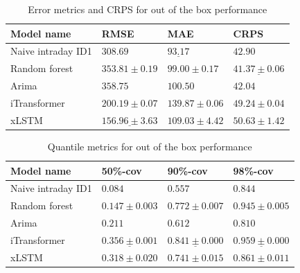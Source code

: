 \documentclass[class=scrbook, crop=false]{standalone}
\begin{document}
  
  \begin{table}[]
\centering
\begin{tabular}{l|l|l|l}
Model name 		&  RMSE 			& MAE 			& CRPS 			\\\hline
Naive intraday ID1 	&$ 308.69 			$&$ \underline{93.17} 			$&$ 42.90			$ \\
Random forest 		&$ 353.81 \pm 0.19	$&$  99.00	\pm 0.17	$&$ \underline{41.37 \pm 0.06}	$\\
Arima 			&$ 358.75 			$&$ 100.50 		$&$ 42.04  			$\\	
iTransformer 		&$ 200.19 \pm 0.07	$&$ 139.87	\pm 0.06	$&$ 49.24 \pm 0.04	$ \\
xLSTM 			&$ \underline{156.96 \pm 3.63}	$&$ 109.03 \pm 4.42 	$&$ 50.63 \pm 1.42 	 $\\
\end{tabular}
\caption{Error metrics and CRPS for out of the box performance}
\label{Table::Out_of_the_box_performance}
\end{table}
\begin{table}
\centering
\begin{tabular}{l|l|l|l}
Model name 		&  50\%-cov 		& 90\%-cov 		& 98\%-cov \\\hline
Naive intraday ID1 	&$ 0.084			$&$ 0.557 			$&$ 0.844			$ \\
Random forest 		&$ 0.147 \pm0.003	$&$ 0.772\pm 0.007	$&$ 0.945	 \pm 0.005	$\\
Arima 			&$ 0.211			$&$ 0.612	 		$&$0.810 			$\\	
iTransformer 		&$ \underline{0.356	\pm 0.001}	$&$ \underline{0.841	\pm 0.000}	$&$ \underline{0.959 \pm 0.000}	$ \\
xLSTM 			&$ 0.318 \pm 0.020	$&$ 0.741 	\pm 0.015	$&$ 0.861 \pm 0.011	 $\\
\end{tabular}
\caption{Quantile metrics for out of the box performance}
\label{Table::Out_of_the_box_performance_quantile}
\end{table}


\end{document}
